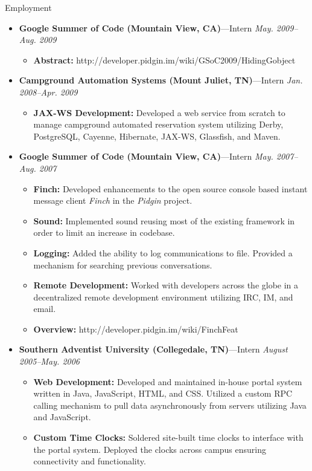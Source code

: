 \documentclass[11pt,oneside]{article}
\newenvironment{ressection}[1]{
	\vspace{4pt}
	{\fontfamily{phv}\selectfont\Large#1}
	\begin{itemize}
	\vspace{3pt}
}{
	\end{itemize}
}
\newcommand{\ressubitem}[1]{
	\vspace{-1pt}
	\item \begin{flushleft} #1 \end{flushleft}
}
\newcommand{\resbigitem}[3]{
	\vspace{-5pt}
	\item
	{\textbf{#1}---#2 \hfill \textit{#3}}
}
\newenvironment{restitledposition}[3]{
	\resbigitem{#1}{#2}{#3}
	\vspace{-2pt}
	\begin{itemize}
}{
	\end{itemize}
}
\begin{document}
\begin{ressection}{Employment}
\begin{restitledposition}{Google Summer of Code (Mountain View, CA)}{Intern}{May. 2009--Aug. 2009}
		\ressubitem{\textbf{Abstract:} http://developer.pidgin.im/wiki/GSoC2009/HidingGobject}

	\end{restitledposition}

	\begin{restitledposition}{Campground Automation Systems (Mount Juliet, TN)}{Intern}{Jan. 2008--Apr. 2009}

    \ressubitem{\textbf{JAX-WS Development:} Developed a web service from scratch to
		manage campground automated reservation system utilizing Derby, PostgreSQL, 
		Cayenne, Hibernate, JAX-WS, Glassfish, and Maven.}
		
	\end{restitledposition}

	\begin{restitledposition}{Google Summer of Code (Mountain View, CA)}{Intern}{May. 2007--Aug. 2007}

		\ressubitem{\textbf{Finch:} Developed enhancements to the open source console
		based instant message client \textit{Finch} in the \textit{Pidgin} project.}

		\ressubitem{\textbf{Sound:} Implemented sound reusing most of the existing
		framework in order to limit an increase in codebase.}

		\ressubitem{\textbf{Logging:} Added the ability to log communications to file. 
		Provided a mechanism for searching previous conversations.}

		\ressubitem{\textbf{Remote Development:} Worked with developers across the globe in
		a decentralized remote development environment utilizing IRC, IM, and email.}

		\ressubitem{\textbf{Overview:} http://developer.pidgin.im/wiki/FinchFeat}
		
	\end{restitledposition}

	\begin{restitledposition}{Southern Adventist University (Collegedale, TN)}{Intern}{August 2005--May. 2006}

	\ressubitem{\textbf{Web Development:} Developed and maintained
	in-house portal system written in Java, JavaScript, HTML, and CSS.
	Utilized a custom RPC calling mechanism	to pull data asynchronously
	from servers utilizing Java and JavaScript.}

	\ressubitem{\textbf{Custom Time Clocks:} Soldered site-built time clocks to
	interface with the portal system.  Deployed the clocks across campus ensuring
	connectivity and functionality.}


\end{restitledposition}
\end{ressection}
\end{document}
